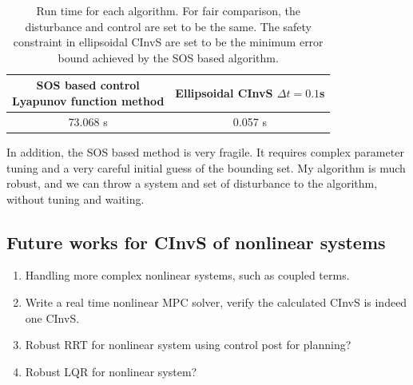\documentclass{article}
\begin{document}
\begin{table}[H]
	\centering
	\begin{tabular}{|c|c|}
		\hline
		\makecell{SOS based control\\Lyapunov function method \cite{sos-tracking}}  & \makecell{Ellipsoidal CInvS\\$\Delta t = 0.1$s}\\
		\hline
		73.068 s & 0.057 s \\
		\hline
	\end{tabular}
	\caption{Run time for each algorithm. For fair comparison, the disturbance and control are set to be the same. The safety constraint in ellipsoidal CInvS are set to be the minimum error bound achieved by the SOS based algorithm.}
	\label{5d-runtime}
\end{table}

In addition, the SOS based method is very fragile. It requires complex parameter tuning and a very careful initial guess of the bounding set. My algorithm is much robust, and we can throw a system and set of disturbance to the algorithm, without tuning and waiting.

\subsection{Future works for CInvS of nonlinear systems}
\begin{enumerate}
	\item Handling more complex nonlinear systems, such as coupled terms.
	\item Write a real time nonlinear MPC solver, verify the calculated CInvS is indeed one CInvS.
	\item Robust RRT for nonlinear system using control post for planning?
	\item Robust LQR for nonlinear system?
\end{enumerate}



\end{document}
